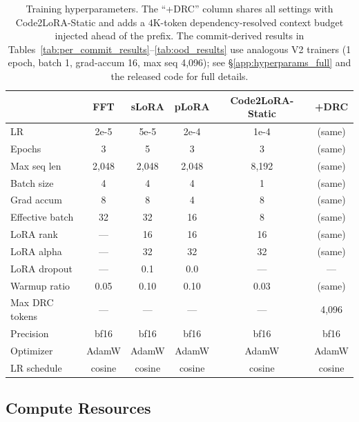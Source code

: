 \documentclass[11pt]{article}
\newcommand{\codelora}{Code2LoRA\xspace}
\newcommand{\codelorastatic}{\codelora-Static\xspace}
\begin{document}
\begin{table}[t]
\begin{small}
\begin{center}
\caption{Training hyperparameters. The ``+DRC'' column shares all settings with \codelorastatic{} and adds a $4$K-token dependency-resolved context budget injected ahead of the prefix. The commit-derived results in Tables~\ref{tab:per_commit_results}--\ref{tab:ood_results} use analogous V2 trainers (1 epoch, batch 1, grad-accum 16, max seq 4,096); see \S\ref{app:hyperparams_full} and the released code for full details.}\label{tab:training_details}

\begin{tabular}{lccccc}
\toprule
& FFT & sLoRA & pLoRA & \codelorastatic{} & +DRC \\
\midrule
LR & 2e-5 & 5e-5 & 2e-4 & 1e-4 & (same) \\
Epochs & 3 & 5 & 3 & 3 & (same) \\
Max seq len & 2,048 & 2,048 & 2,048 & 8,192 & (same) \\
Batch size & 4 & 4 & 4 & 1 & (same) \\
Grad accum & 8 & 8 & 4 & 8 & (same) \\
Effective batch & 32 & 32 & 16 & 8 & (same) \\
LoRA rank & --- & 16 & 16 & 16 & (same) \\
LoRA alpha & --- & 32 & 32 & 32 & (same) \\
LoRA dropout & --- & 0.1 & 0.0 & --- & --- \\
Warmup ratio & 0.05 & 0.10 & 0.10 & 0.03 & (same) \\
Max DRC tokens & --- & --- & --- & --- & 4,096 \\
Precision & bf16 & bf16 & bf16 & bf16 & bf16 \\
Optimizer & AdamW & AdamW & AdamW & AdamW & AdamW \\
LR schedule & cosine & cosine & cosine & cosine & cosine \\
\bottomrule
\end{tabular}


\end{center}
\end{small}
\end{table}

\subsection{Compute Resources}
\label{app:compute}
\end{document}
